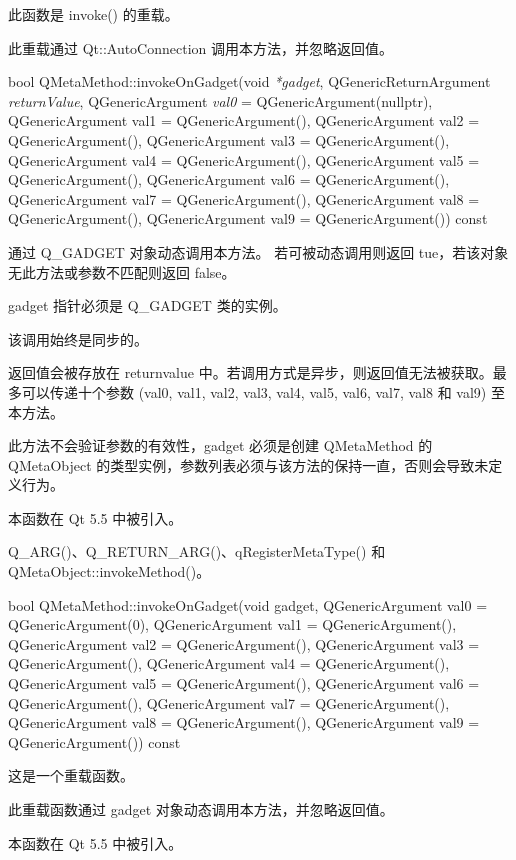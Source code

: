 此函数是 invoke() 的重载。

此重载通过 Qt::AutoConnection 调用本方法，并忽略返回值。

bool QMetaMethod::invokeOnGadget(void \emph{*gadget}, QGenericReturnArgument \emph{returnValue}, QGenericArgument \emph{val0} = QGenericArgument(nullptr), QGenericArgument val1 = QGenericArgument(), QGenericArgument val2 = QGenericArgument(), QGenericArgument val3 = QGenericArgument(), QGenericArgument val4 = QGenericArgument(), QGenericArgument val5 = QGenericArgument(), QGenericArgument val6 = QGenericArgument(), QGenericArgument val7 = QGenericArgument(), QGenericArgument val8 = QGenericArgument(), QGenericArgument val9 = QGenericArgument()) const

通过 Q\_GADGET 对象动态调用本方法。
若可被动态调用则返回 tue，若该对象无此方法或参数不匹配则返回 false。

gadget 指针必须是 Q\_GADGET 类的实例。

该调用始终是同步的。

返回值会被存放在 returnvalue 中。若调用方式是异步，则返回值无法被获取。最多可以传递十个参数 (val0, val1, val2, val3, val4, val5, val6, val7, val8 和 val9) 至本方法。

\begin{seeAlso}
此方法不会验证参数的有效性，gadget 必须是创建 QMetaMethod 的 QMetaObject 的类型实例，参数列表必须与该方法的保持一直，否则会导致未定义行为。
\end{seeAlso}

本函数在 Qt 5.5 中被引入。

\begin{seeAlso}
Q\_ARG()、Q\_RETURN\_ARG()、qRegisterMetaType() 和 QMetaObject::invokeMethod()。
\end{seeAlso}

bool QMetaMethod::invokeOnGadget(void \*gadget, QGenericArgument val0 = QGenericArgument(0), QGenericArgument val1 = QGenericArgument(), QGenericArgument val2 = QGenericArgument(), QGenericArgument val3 = QGenericArgument(), QGenericArgument val4 = QGenericArgument(), QGenericArgument val5 = QGenericArgument(), QGenericArgument val6 = QGenericArgument(), QGenericArgument val7 = QGenericArgument(), QGenericArgument val8 = QGenericArgument(), QGenericArgument val9 = QGenericArgument()) const

这是一个重载函数。

此重载函数通过 gadget 对象动态调用本方法，并忽略返回值。

本函数在 Qt 5.5 中被引入。

